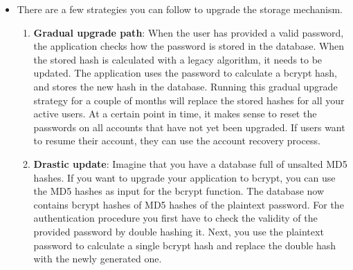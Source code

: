 \documentclass[../main.tex]{subfiles}
\begin{document}
\begin{itemize}
\item There are a few strategies you can follow to upgrade the storage mechanism.
\begin{enumerate}
\item \textbf{Gradual upgrade path}: When the user has provided a valid password, the application checks how the password is stored in the database. When the stored hash is calculated with a legacy algorithm, it needs to be updated. The application uses the password to calculate a bcrypt hash, and stores the new hash in the database. Running this gradual upgrade strategy for a couple of months will replace the stored hashes for all your active users. At a certain point in time, it makes sense to reset the passwords on all accounts that have not yet been upgraded. If users want to resume their account, they can use the account recovery process.
\item \textbf{Drastic update}: Imagine that you have a database full of unsalted MD5 hashes. If you want to upgrade your application to bcrypt, you can use the MD5 hashes as input for the bcrypt function. The database now contains bcrypt hashes of MD5 hashes of the plaintext password. For the authentication procedure you first have to check the validity of the provided password by double hashing it. Next, you use the plaintext password to calculate a single bcrypt hash and replace the double hash with the newly generated one.
\end{enumerate}
\end{itemize}
\end{document}
